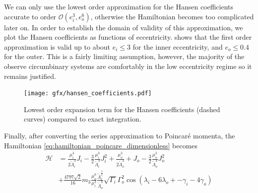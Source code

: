 \documentclass[twoside,openright,titlepage,numbers=noenddot,headinclude,%
                footinclude=true,cleardoublepage=empty,abstractoff, 
                BCOR=5mm,paper=a4,fontsize=11pt,%
                american,%
                ]{scrreprt}%
\begin{document}
We can only use the lowest order approximation for the Hansen coefficients
accurate to order 
$\mathcal{O}(e_i^3,e_o^6)$, otherwise the Hamiltonian becomes too complicated
later on. In order to establish the domain of validity of this approximation,
we plot the Hansen coefficients as functions of eccentricity.
 shows that the first order approximation is 
valid up to about $e_i\leq 3$ for the inner eccentricity, and $e_o\leq 0.4$
for the outer. This is a fairly limiting assumption, however, the majority
of the observe circumbinary systems are comfortably in the low eccentricity
regime so it remains justified.
\begin{figure}[htb]
\centering
\texttt{[image: gfx/hansen\_coefficients.pdf]}
    \caption[Approximation of Hansen coefficients.]{Lowest order expansion 
    term for the Hansen coefficients (dashed curves) 
    compared to exact integration.}
\label{fig:hansen_coefficients}
\end{figure}
Finally, after converting the series approximation to Poincaré momenta, the 
Hamiltonian \ref{eq:hamiltonian_poincare_dimensionless} becomes
\begin{equation}
    \begin{aligned}
        \mathcal{H}&=\frac{\mu_i^3}{2\tilde{\Lambda}_i^3}
        J_i - \frac{3}{2}
        \frac{\mu_i^3}{\tilde{\Lambda}_i^4} J_i^2+
    \frac{\mu_o^3}{2\tilde{\Lambda}_o^3}+
        J_o - \frac{3}{2}
        \frac{\mu_o^3}{\tilde{\Lambda}_o^4} J_o^2\\
        &+\frac{4797\sqrt{2}}{16}m_3 \frac{\mu_o^6}{\mu_i^3} 
        \frac{\tilde{\Lambda}_i^{ \frac{7}{2} }}
        {\tilde{\Lambda}_o^8}\sqrt{\Gamma_i}\Gamma_o^2
    \cos(\lambda_i-6\lambda_o+
    -\gamma_i - 4\gamma_o)
    \end{aligned}
    \label{eq:hamiltonian_poincare_dimensionless_expand}
\end{equation}
\end{document}
